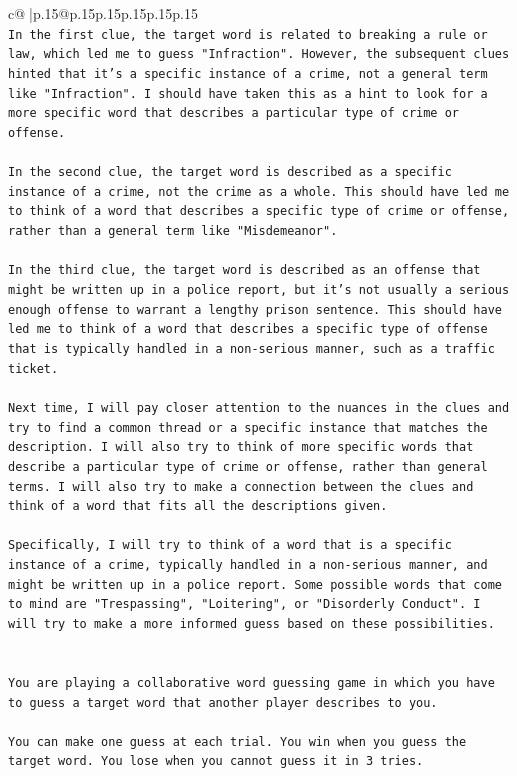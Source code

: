 \documentclass{article}
\begin{document}
{\begin{supertabular}{c@{$\;$}|p{.15\linewidth}@{}p{.15\linewidth}p{.15\linewidth}p{.15\linewidth}p{.15\linewidth}p{.15\linewidth}}
{{{\\ 
\texttt{In the first clue, the target word is related to breaking a rule or law, which led me to guess "Infraction". However, the subsequent clues hinted that it's a specific instance of a crime, not a general term like "Infraction". I should have taken this as a hint to look for a more specific word that describes a particular type of crime or offense.} \\
\\ 
\texttt{In the second clue, the target word is described as a specific instance of a crime, not the crime as a whole. This should have led me to think of a word that describes a specific type of crime or offense, rather than a general term like "Misdemeanor".} \\
\\ 
\texttt{In the third clue, the target word is described as an offense that might be written up in a police report, but it's not usually a serious enough offense to warrant a lengthy prison sentence. This should have led me to think of a word that describes a specific type of offense that is typically handled in a non{-}serious manner, such as a traffic ticket.} \\
\\ 
\texttt{Next time, I will pay closer attention to the nuances in the clues and try to find a common thread or a specific instance that matches the description. I will also try to think of more specific words that describe a particular type of crime or offense, rather than general terms. I will also try to make a connection between the clues and think of a word that fits all the descriptions given.} \\
\\ 
\texttt{Specifically, I will try to think of a word that is a specific instance of a crime, typically handled in a non{-}serious manner, and might be written up in a police report. Some possible words that come to mind are "Trespassing", "Loitering", or "Disorderly Conduct". I will try to make a more informed guess based on these possibilities.} \\
\\ 
\\ 
\texttt{You are playing a collaborative word guessing game in which you have to guess a target word that another player describes to you.} \\
\\ 
\texttt{You can make one guess at each trial. You win when you guess the target word. You lose when you cannot guess it in 3 tries.} \\
}}}
\end{supertabular}}
\end{document}

